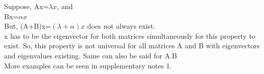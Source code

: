 \documentclass[]{article}
\begin{document}
\noindent
Suppose, Ax=$\lambda x$, and\\
Bx=$\alpha x$\\

\noindent
But, (A+B)x=$(\lambda + \alpha)x$ does not always exist.\\

\noindent
x has to be the eigenvector for both matrices simultaneously for this property to exist. So, this property is not universal for all matrices A and B with eigenvectors and eigenvalues existing. Same can also be said for A.B\\

\noindent
More examples can be seen in supplementary notes 1.




	
\end{document}
